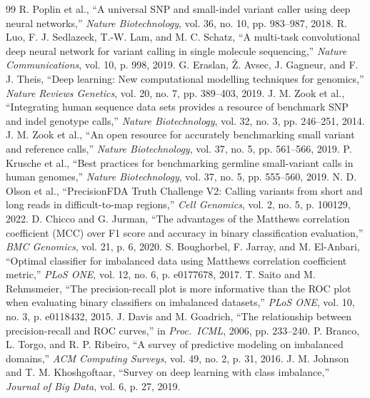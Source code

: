 \documentclass[11pt, a4paper]{article}
\begin{document}
\begin{thebibliography}{99}
\setlength{\itemsep}{1.5pt}
\setlength{\parskip}{0pt}
\small
{} R. Poplin et al., ``A universal SNP and small-indel variant caller using deep neural networks,'' \textit{Nature Biotechnology}, vol. 36, no. 10, pp. 983--987, 2018.
 R. Luo, F. J. Sedlazeck, T.-W. Lam, and M. C. Schatz, ``A multi-task convolutional deep neural network for variant calling in single molecule sequencing,'' \textit{Nature Communications}, vol. 10, p. 998, 2019.
 G. Eraslan, \v{Z}. Avsec, J. Gagneur, and F. J. Theis, ``Deep learning: New computational modelling techniques for genomics,'' \textit{Nature Reviews Genetics}, vol. 20, no. 7, pp. 389--403, 2019.
 J. M. Zook et al., ``Integrating human sequence data sets provides a resource of benchmark SNP and indel genotype calls,'' \textit{Nature Biotechnology}, vol. 32, no. 3, pp. 246--251, 2014.
 J. M. Zook et al., ``An open resource for accurately benchmarking small variant and reference calls,'' \textit{Nature Biotechnology}, vol. 37, no. 5, pp. 561--566, 2019.
 P. Krusche et al., ``Best practices for benchmarking germline small-variant calls in human genomes,'' \textit{Nature Biotechnology}, vol. 37, no. 5, pp. 555--560, 2019.
 N. D. Olson et al., ``PrecisionFDA Truth Challenge V2: Calling variants from short and long reads in difficult-to-map regions,'' \textit{Cell Genomics}, vol. 2, no. 5, p. 100129, 2022.
 D. Chicco and G. Jurman, ``The advantages of the Matthews correlation coefficient (MCC) over F1 score and accuracy in binary classification evaluation,'' \textit{BMC Genomics}, vol. 21, p. 6, 2020.
 S. Boughorbel, F. Jarray, and M. El-Anbari, ``Optimal classifier for imbalanced data using Matthews correlation coefficient metric,'' \textit{PLoS ONE}, vol. 12, no. 6, p. e0177678, 2017.
 T. Saito and M. Rehmsmeier, ``The precision-recall plot is more informative than the ROC plot when evaluating binary classifiers on imbalanced datasets,'' \textit{PLoS ONE}, vol. 10, no. 3, p. e0118432, 2015.
 J. Davis and M. Goadrich, ``The relationship between precision-recall and ROC curves,'' in \textit{Proc.\ ICML}, 2006, pp. 233--240.
 P. Branco, L. Torgo, and R. P. Ribeiro, ``A survey of predictive modeling on imbalanced domains,'' \textit{ACM Computing Surveys}, vol. 49, no. 2, p. 31, 2016.
 J. M. Johnson and T. M. Khoshgoftaar, ``Survey on deep learning with class imbalance,'' \textit{Journal of Big Data}, vol. 6, p. 27, 2019.

\end{thebibliography}
\end{document}
